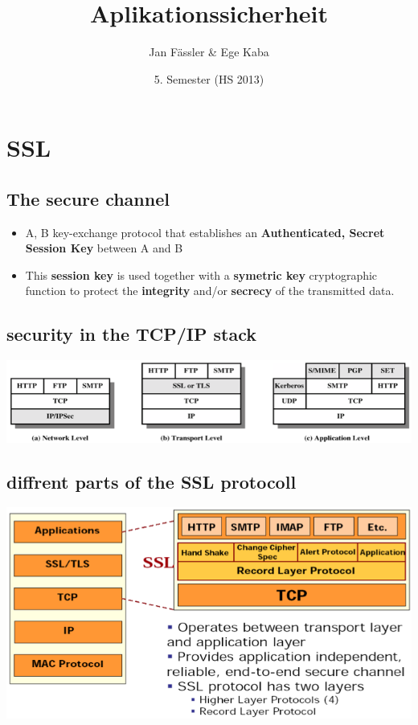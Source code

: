 \documentclass[10pt]{article}
\title{
	\vspace{5cm}
	Aplikationssicherheit
}
\author{Jan Fässler \& Ege Kaba}
\date{5. Semester (HS 2013)}
\begin{document}
\maketitle
\thispagestyle{fancy}

\newpage

\tableofcontents	  	


\newpage
\setcounter{page}{1}


\section{SSL}
\subsection{The secure channel}
\begin{itemize}
	\item A, B key-exchange protocol that establishes an \textbf{Authenticated, Secret Session Key} between A and B
	\item This \textbf{session key }is used together with a \textbf{symetric key} cryptographic function to protect the \textbf{integrity} and/or \textbf{secrecy} of the transmitted data.
\end{itemize}
\subsection{security in the TCP/IP stack}
\begin{center}
	\includegraphics[scale=0.5]{ssl_in_tcpip.png}
\end{center}
\subsection{diffrent parts of the SSL protocoll}
\begin{center}
	\includegraphics[scale=0.5]{ssl_diffrent_parts.png}
\end{center}
\end{document}
